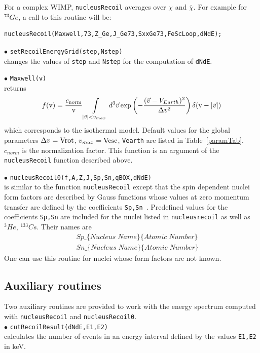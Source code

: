 \documentclass[12pt,a4paper]{article}
\begin{document}
For a complex WIMP, \verb|nucleusRecoil| averages over $\chi$ and
$\overline{\chi}$. For example for $^{73}Ge$, a call to this routine will be: 
\begin{verbatim}
nucleusRecoil(Maxwell,73,Z_Ge,J_Ge73,SxxGe73,FeScLoop,dNdE);
\end{verbatim}


\noindent
$\bullet$ \verb|setRecoilEnergyGrid(step,Nstep)| \\
changes the values of \verb|step| and \verb|Nstep| for the computation of \verb|dNdE|.


\noindent
$\bullet$ \verb|Maxwell(v)| \\
returns   
$$f(\mbox{v})= \frac{c_{\rm{norm}}}{\mbox{v}}\int\limits_{|\vec{v}|<v_{max}} d^3\vec{v} \exp\left(
-\frac{(\vec{v}-V_{Earth})^2}{\Delta v^2}\right)\delta(\mbox{v} -|\vec{v}|)
$$
which corresponds to the isothermal model. Default values for the global parameters 
$\Delta v ={\rm Vrot}$,  $v_{max}={\rm Vesc}$, \verb|Vearth| are listed in Table~\ref{paramTab}.
$c_{norm}$ is the normalization factor.  This function is an
argument of the \verb|nucleusRecoil| function described above.


\noindent
$\bullet$ \verb|nucleusRecoil0(f,A,Z,J,Sp,Sn,qBOX,dNdE)|\\
is similar to the  function \verb|nucleusRecoil| except that 
the spin dependent nuclei form factors are described by Gauss functions
whose values  at zero momentum transfer are defined by the coefficients \verb|Sp,Sn|~\cite{Belanger:2008sj}. 
Predefined values for the coefficients \verb|Sp,Sn| are included for the
nuclei listed in \verb|nucleusrecoil| as well as ${}^3He$, ${}^{133}Cs$. Their  names are 
\begin{eqnarray}
    &&Sp\_\{Nucleus\; Name\}\{Atomic \;Number\} \nonumber\\
    &&Sn\_\{Nucleus\; Name\}\{Atomic\; Number\} \nonumber
\end{eqnarray}
One can use this routine for nuclei whose form factors  are not known. 



\subsection{Auxiliary routines}
Two auxiliary routines are provided to work with the energy
spectrum computed with
\verb|nucleusRecoil| and  \verb|nucleusRecoil0|.\\
%
\noindent
$\bullet$ \verb|cutRecoilResult(dNdE,E1,E2)|\\
calculates the number of events in an energy interval defined by the
values \verb|E1,E2| in keV.
\end{document}
